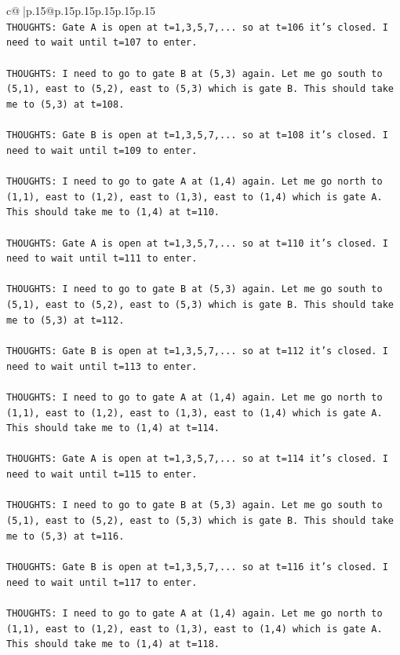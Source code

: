 \documentclass{article}
\begin{document}
{\begin{supertabular}{c@{$\;$}|p{.15\linewidth}@{}p{.15\linewidth}p{.15\linewidth}p{.15\linewidth}p{.15\linewidth}p{.15\linewidth}}
{{{\\ 
\texttt{THOUGHTS: Gate A is open at t=1,3,5,7,... so at t=106 it's closed. I need to wait until t=107 to enter.} \\
\\ 
\texttt{THOUGHTS: I need to go to gate B at (5,3) again. Let me go south to (5,1), east to (5,2), east to (5,3) which is gate B. This should take me to (5,3) at t=108.} \\
\\ 
\texttt{THOUGHTS: Gate B is open at t=1,3,5,7,... so at t=108 it's closed. I need to wait until t=109 to enter.} \\
\\ 
\texttt{THOUGHTS: I need to go to gate A at (1,4) again. Let me go north to (1,1), east to (1,2), east to (1,3), east to (1,4) which is gate A. This should take me to (1,4) at t=110.} \\
\\ 
\texttt{THOUGHTS: Gate A is open at t=1,3,5,7,... so at t=110 it's closed. I need to wait until t=111 to enter.} \\
\\ 
\texttt{THOUGHTS: I need to go to gate B at (5,3) again. Let me go south to (5,1), east to (5,2), east to (5,3) which is gate B. This should take me to (5,3) at t=112.} \\
\\ 
\texttt{THOUGHTS: Gate B is open at t=1,3,5,7,... so at t=112 it's closed. I need to wait until t=113 to enter.} \\
\\ 
\texttt{THOUGHTS: I need to go to gate A at (1,4) again. Let me go north to (1,1), east to (1,2), east to (1,3), east to (1,4) which is gate A. This should take me to (1,4) at t=114.} \\
\\ 
\texttt{THOUGHTS: Gate A is open at t=1,3,5,7,... so at t=114 it's closed. I need to wait until t=115 to enter.} \\
\\ 
\texttt{THOUGHTS: I need to go to gate B at (5,3) again. Let me go south to (5,1), east to (5,2), east to (5,3) which is gate B. This should take me to (5,3) at t=116.} \\
\\ 
\texttt{THOUGHTS: Gate B is open at t=1,3,5,7,... so at t=116 it's closed. I need to wait until t=117 to enter.} \\
\\ 
\texttt{THOUGHTS: I need to go to gate A at (1,4) again. Let me go north to (1,1), east to (1,2), east to (1,3), east to (1,4) which is gate A. This should take me to (1,4) at t=118.} \\
}}}
\end{supertabular}}
\end{document}
